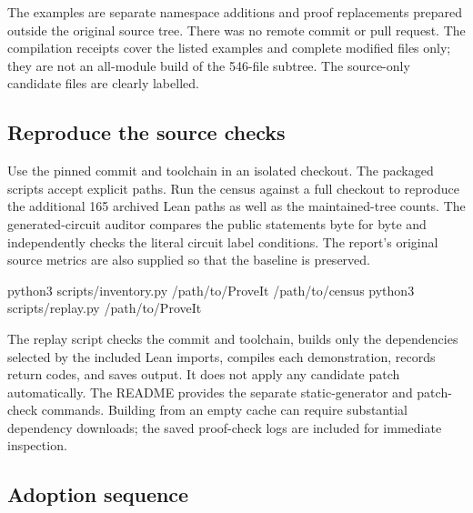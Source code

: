 \documentclass[11pt,letterpaper]{article}
\begin{document}


The examples are separate namespace additions and proof replacements prepared outside the original source tree. There was no remote commit or pull request. The compilation receipts cover the listed examples and complete modified files only; they are not an all-module build of the 546-file subtree. The source-only candidate files are clearly labelled.

\subsection{Reproduce the source checks}

Use the pinned commit and toolchain in an isolated checkout. The packaged scripts accept explicit paths. Run the census against a full checkout to reproduce the additional 165 archived Lean paths as well as the maintained-tree counts. The generated-circuit auditor compares the public statements byte for byte and independently checks the literal circuit label conditions. The report's original source metrics are also supplied so that the baseline is preserved.

\begin{Lean}
python3 scripts/inventory.py /path/to/ProveIt /path/to/census
python3 scripts/replay.py /path/to/ProveIt
\end{Lean}

The replay script checks the commit and toolchain, builds only the dependencies selected by the included Lean imports, compiles each demonstration, records return codes, and saves output. It does not apply any candidate patch automatically. The README provides the separate static-generator and patch-check commands. Building from an empty cache can require substantial dependency downloads; the saved proof-check logs are included for immediate inspection.

\subsection{Adoption sequence}
\end{document}
